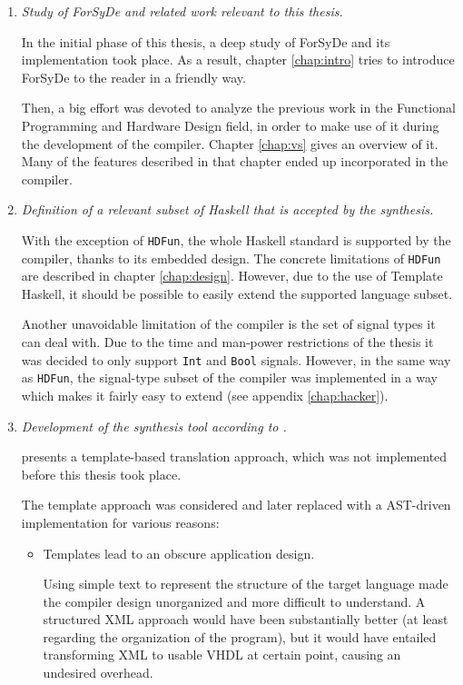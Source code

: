 \begin{enumerate}[1)]
\item \textit{Study of ForSyDe and related work relevant to this thesis.}

  In the initial phase of this thesis, a deep study of ForSyDe and its
  implementation took place. As a result, chapter \ref{chap:intro} tries to
  introduce ForSyDe to the reader in a friendly way.
  
  Then, a big effort was devoted to analyze the previous work in the
  Functional Programming and Hardware Design field, in order to make
  use of it during the development of the compiler.  Chapter
  \ref{chap:vs} gives an overview of it. Many of the features
  described in that chapter ended up incorporated in the compiler.
   

\item \textit{Definition of a relevant subset of Haskell that is accepted by
  the synthesis.}

With the exception of \texttt{HDFun}, the whole Haskell standard is
supported by the compiler, thanks to its embedded design. The concrete
limitations of \texttt{HDFun} are described in chapter
\ref{chap:design}.  However, due to the use of Template Haskell, it
should be possible to easily extend the supported language subset.

Another unavoidable limitation of the compiler is the set of signal
types it can deal with. Due to the time and man-power restrictions of
the thesis it was decided to only support \texttt{Int} and
\texttt{Bool} signals. However, in the same way as \texttt{HDFun}, the
signal-type subset of the compiler was implemented in a way which makes
it fairly easy to extend (see appendix \ref{chap:hacker}).

\item \textit{Development of the synthesis tool according to
     \cite{forsyde:thesis}.}

   \cite{forsyde:thesis} presents a template-based translation
  approach, which was not implemented before this thesis took
  place.

  The template approach was considered and later replaced with a
  AST-driven implementation for various reasons:
  
  \begin{itemize}
  \item Templates lead to an obscure application design.  
    
    Using simple text to represent the structure of the target
    language made the compiler design unorganized and more difficult
    to understand.  A structured XML approach would have been
    substantially better (at least regarding the organization of the
    program), but it would have entailed transforming XML to usable
    VHDL at certain point, causing an undesired overhead.
    

\end{itemize}
\end{enumerate}
